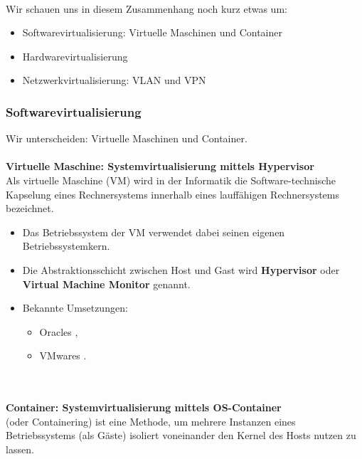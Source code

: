 ~\\
Wir schauen uns in diesem Zusammenhang noch kurz etwas um:
\begin{itemize}
	\item Softwarevirtualisierung: Virtuelle Maschinen und Container
	\item Hardwarevirtualisierung
	\item Netzwerkvirtualisierung: VLAN und VPN
\end{itemize}






\subsubsection{Softwarevirtualisierung}
Wir unterscheiden: Virtuelle Maschinen und Container.\\
~\\
\textbf{Virtuelle Maschine: Systemvirtualisierung mittels Hypervisor}\\
Als virtuelle Maschine (VM) wird in der Informatik die Software-technische Kapselung eines Rechnersystems innerhalb eines lauffähigen Rechnersystems bezeichnet.
\begin{itemize}
	\item Das Betriebssystem der VM verwendet dabei seinen eigenen Betriebssystemkern.
	\item Die Abstraktionsschicht zwischen Host und Gast wird \textbf{Hypervisor} oder \textbf{Virtual Machine Monitor} genannt.
	\item Bekannte Umsetzungen:
	\begin{itemize}
		\item Oracles ,
		\item VMwares . 
	\end{itemize}
\end{itemize}  
~\\~\\
\textbf{Container: Systemvirtualisierung mittels OS-Container}\\
 (oder Containering) ist eine Methode, um mehrere Instanzen eines Betriebssystems (als Gäste) isoliert voneinander den Kernel des Hosts nutzen zu lassen.

